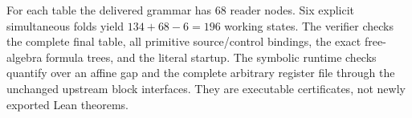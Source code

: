 For each table the delivered grammar has $68$ reader nodes. Six explicit
simultaneous folds yield $134+68-6=196$ working states. The verifier checks
the complete final table, all primitive source/control bindings, the exact
free-algebra formula trees, and the literal startup. The symbolic runtime
checks quantify over an affine gap and the complete arbitrary register
file through the unchanged upstream block interfaces. They are executable
certificates, not newly exported Lean theorems.
